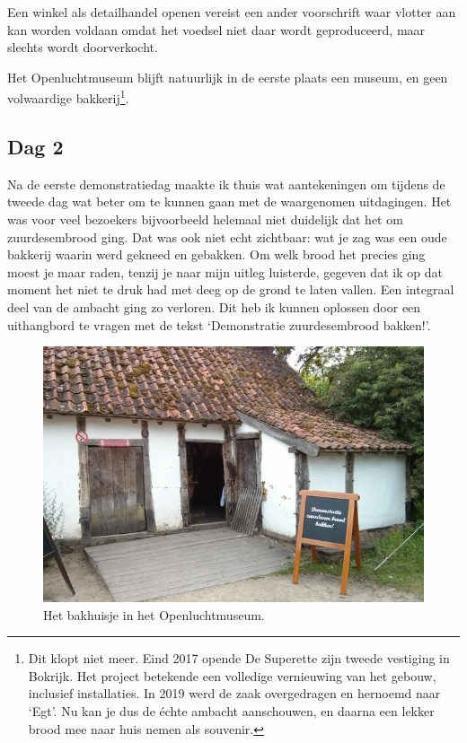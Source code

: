 \documentclass[
  11pt,
  dutch,
]{memoir}
\begin{document}
Een winkel als detailhandel openen vereist een ander voorschrift waar
vlotter aan kan worden voldaan omdat het voedsel niet daar wordt
geproduceerd, maar slechts wordt doorverkocht.

Het Openluchtmuseum blijft natuurlijk in de eerste plaats een museum, en
geen volwaardige bakkerij\footnote{Dit klopt niet meer. Eind 2017 opende
  De Superette zijn tweede vestiging in Bokrijk. Het project betekende
  een volledige vernieuwing van het gebouw, inclusief installaties. In
  2019 werd de zaak overgedragen en hernoemd naar `Egt'. Nu kan je dus
  de échte ambacht aanschouwen, en daarna een lekker brood mee naar huis
  nemen als souvenir.}.

\hypertarget{dag-2}{%
\subsection{Dag 2}\label{dag-2}}

Na de eerste demonstratiedag maakte ik thuis wat aantekeningen om
tijdens de tweede dag wat beter om te kunnen gaan met de waargenomen
uitdagingen. Het was voor veel bezoekers bijvoorbeeld helemaal niet
duidelijk dat het om zuurdesembrood ging. Dat was ook niet echt
zichtbaar: wat je zag was een oude bakkerij waarin werd gekneed en
gebakken. Om welk brood het precies ging moest je maar raden, tenzij je
naar mijn uitleg luisterde, gegeven dat ik op dat moment het niet te
druk had met deeg op de grond te laten vallen. Een integraal deel van de
ambacht ging zo verloren. Dit heb ik kunnen oplossen door een
uithangbord te vragen met de tekst `Demonstratie zuurdesembrood
bakken!'.

\begin{figure}
\centering
\includegraphics{img/bw/bokrijk.jpg}
\caption{Het bakhuisje in het Openluchtmuseum.}
\end{figure}
\end{document}
